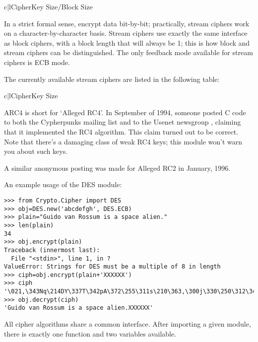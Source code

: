 \documentclass{howto}
\begin{document}
\begin{tableii}{c|l}{}{Cipher}{Key Size/Block Size}
\end{tableii}

In a strict formal sense,  encrypt data bit-by-bit;
practically, stream ciphers work on a character-by-character basis.
Stream ciphers use exactly the
same interface as block ciphers, with a block length that will always
be 1; this is how block and stream ciphers can be distinguished. 
The only feedback mode available for stream ciphers is ECB mode. 

The currently available stream ciphers are listed in the following table:

\begin{tableii}{c|l}{}{Cipher}{Key Size}
\end{tableii}

ARC4 is short for `Alleged RC4'.  In September of 1994, someone posted
C code to both the Cypherpunks mailing list and to the Usenet
newsgroup , claiming that it implemented the RC4
algorithm.  This claim turned out to be correct.  Note that there's a
damaging class of weak RC4 keys; this module won't warn you about such keys.

A similar anonymous posting was made for Alleged RC2 in January, 1996.

An example usage of the DES module:
\begin{verbatim}
>>> from Crypto.Cipher import DES
>>> obj=DES.new('abcdefgh', DES.ECB)
>>> plain="Guido van Rossum is a space alien."
>>> len(plain)
34
>>> obj.encrypt(plain)
Traceback (innermost last):
  File "<stdin>", line 1, in ?
ValueError: Strings for DES must be a multiple of 8 in length
>>> ciph=obj.encrypt(plain+'XXXXXX')
>>> ciph
'\021,\343Nq\214DY\337T\342pA\372\255\311s\210\363,\300j\330\250\312\347\342I\3215w\03561\303dgb/\006'
>>> obj.decrypt(ciph)
'Guido van Rossum is a space alien.XXXXXX'
\end{verbatim}

All cipher algorithms share a common interface.  After importing a
given module, there is exactly one function and two variables
available.
\end{document}

